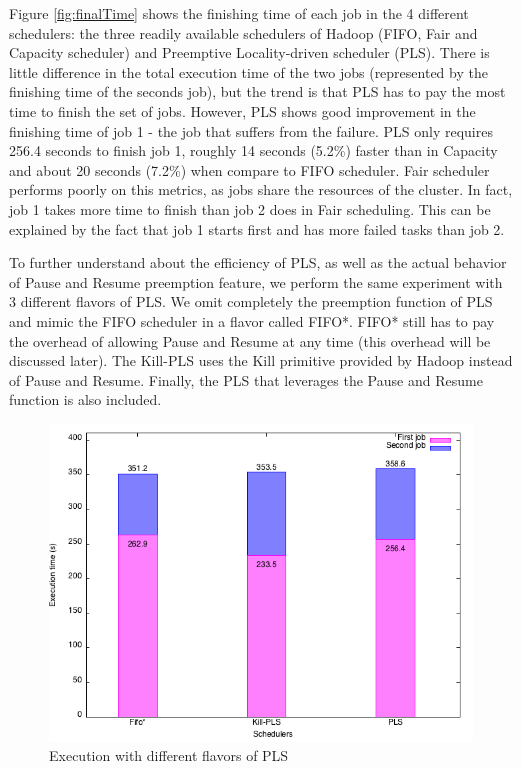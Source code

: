 \documentclass[runningheads,a4paper]{llncs}
\begin{document}
Figure \ref{fig:finalTime} shows the finishing time of each job in the 4 different schedulers: the three readily available schedulers of Hadoop (FIFO, Fair and Capacity scheduler) and Preemptive Locality-driven scheduler (PLS). There is little difference in the total execution time of the two jobs (represented by the finishing time of the seconds job), but the trend is that PLS has to pay the most time to finish the set of jobs. However, PLS shows good improvement in the finishing time of job 1 - the job that suffers from the failure. PLS only requires 256.4 seconds to finish job 1, roughly 14 seconds (5.2\%) faster than in Capacity and about 20 seconds (7.2\%) when compare to FIFO scheduler. Fair scheduler performs poorly on this metrics, as jobs share the resources of the cluster. In fact, job 1 takes more time to finish than job 2 does in Fair scheduling. This can be explained by the fact that job 1 starts first and has more failed tasks than job 2.

To further understand about the efficiency of PLS, as well as the actual behavior of Pause and Resume preemption feature, we perform the same experiment with 3 different flavors of PLS. We omit completely the preemption function of PLS and mimic the FIFO scheduler in a flavor called FIFO*. FIFO* still has to pay the overhead of allowing Pause and Resume at any time (this overhead will be discussed later). The Kill-PLS uses the Kill primitive provided by Hadoop instead of Pause and Resume. Finally, the PLS that leverages the Pause and Resume function is also included.

\begin{figure}[ht]
    \centering
    \includegraphics[width=1\linewidth]{mod.png}
    \caption{Execution with different flavors of PLS}
    \label{fig:flavors}
\end{figure}
\end{document}
